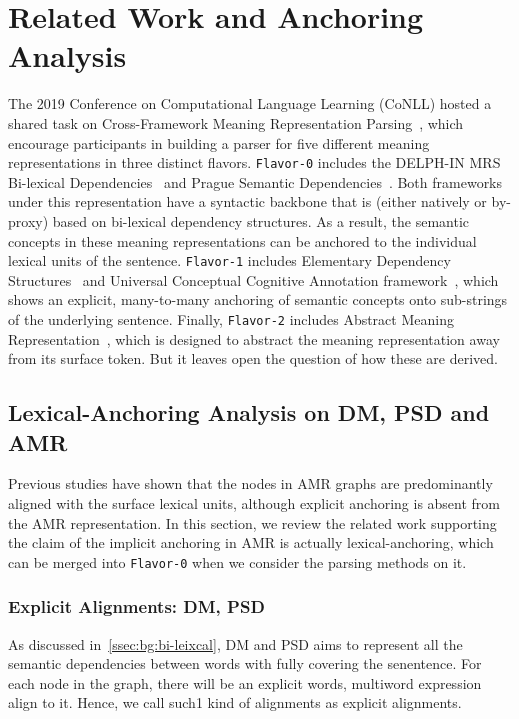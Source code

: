 \section{Related Work and Anchoring Analysis}
\label{sec:lex-phr:anchor-analysis}

The 2019 Conference on Computational Language Learning (CoNLL) hosted
a shared task on Cross-Framework Meaning Representation
Parsing~\cite[MRP 2019,][]{Oep:Abe:Haj:19}, which encourage
participants in building a parser for five different meaning
representations in three distinct flavors. \texttt{Flavor-0} includes
the DELPH-IN MRS Bi-lexical Dependencies~\cite[DM,][]{ivanova2012did}
and Prague Semantic
Dependencies~\cite[PSD,][]{hajic2012announcing,miyao2014house}. Both
frameworks under this representation have a syntactic backbone that is
(either natively or by-proxy) based on bi-lexical dependency
structures. As a result, the semantic concepts in these meaning
representations can be anchored to the individual lexical units of the
sentence. \texttt{Flavor-1} includes Elementary Dependency
Structures~\cite[EDS,][]{oepen2006discriminant} and Universal
Conceptual Cognitive Annotation
framework~\cite[UCCA,][]{abend2013universal}, which shows an explicit,
many-to-many anchoring of semantic concepts onto sub-strings of the
underlying sentence. Finally, \texttt{Flavor-2} includes Abstract
Meaning Representation~\cite[AMR,][]{Banarescu:LWPjKI7N}, which is
designed to abstract the meaning representation away from its surface
token. But it leaves open the question of how these are derived.

\subsection{Lexical-Anchoring Analysis on DM, PSD and AMR}
\label{ssec:lex-phr:lex-anchoring-analysis}
Previous studies have shown that the nodes in AMR graphs are
predominantly aligned with the surface lexical units, although
explicit anchoring is absent from the AMR representation.  In this
section, we review the related work supporting the claim of the
implicit anchoring in AMR is actually lexical-anchoring, which can be
merged into \texttt{Flavor-0} when we consider the parsing methods on
it.

\subsubsection{Explicit Alignments: DM, PSD}
\label{sssec:lex-phr:bi-lexical-anchor}
As discussed in~\autoref{ssec:bg:bi-leixcal}, DM and PSD aims to
represent all the semantic dependencies between words with fully
covering the senentence. For each node in the graph, there will be an
explicit words, multiword expression align to it. Hence, we call such1
kind of alignments as explicit alignments.

